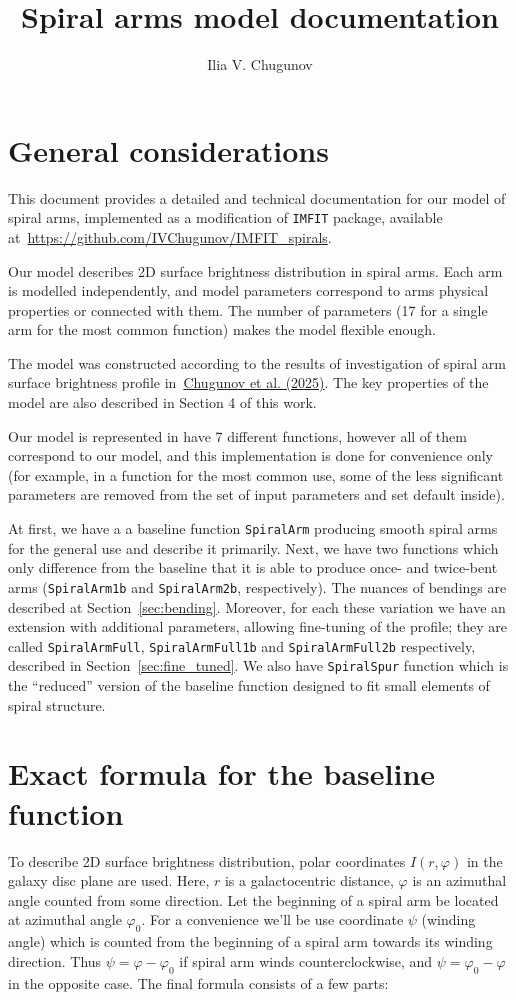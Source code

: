 \documentclass[12pt,a4paper]{article}
\title{Spiral arms model documentation}
\author{Ilia V. Chugunov}
\begin{document}
	
\maketitle
	
\section{General considerations}
This document provides a detailed and technical documentation for our model of spiral arms, implemented as a modification of \verb*|IMFIT| package, available at~\url{https://github.com/IVChugunov/IMFIT_spirals}.

Our model describes 2D surface brightness distribution in spiral arms. Each arm is modelled independently, and model parameters correspond to arms physical properties or connected with them. The number of parameters (17 for a single arm for the most common function) makes the model flexible enough.

The model was constructed according to the results of investigation of spiral arm surface brightness profile in~\href{https://ui.adsabs.harvard.edu/abs/2025Galax..13...44C/abstract}{Chugunov et al. (2025)}. The key properties of the model are also described in Section 4 of this work.

Our model is represented in have 7 different functions, however all of them correspond to our model, and this implementation is done for convenience only (for example, in a function for the most common use, some of the less significant parameters are removed from the set of input parameters and set default inside).

At first, we have a a baseline function \verb*|SpiralArm| producing smooth spiral arms for the general use and describe it primarily. Next, we have two functions which only difference from the baseline that it is able to produce once- and twice-bent arms (\verb*|SpiralArm1b| and \verb*|SpiralArm2b|, respectively). The nuances of bendings are described at Section~\ref{sec:bending}. Moreover, for each these variation we have an extension with additional parameters, allowing fine-tuning of the profile; they are called \verb*|SpiralArmFull|, \verb*|SpiralArmFull1b| and \verb*|SpiralArmFull2b| respectively, described in Section~\ref{sec:fine_tuned}. We also have \verb*|SpiralSpur| function which is the ``reduced'' version of the baseline function designed to fit small elements of spiral structure.

\section{Exact formula for the baseline function}
To describe 2D surface brightness distribution, polar coordinates $I(r, \varphi)$ in the galaxy disc plane are used. Here, $r$ is a galactocentric distance, $\varphi$ is an azimuthal angle counted from some direction. Let the beginning of a spiral arm be located at azimuthal angle $\varphi_0$. For a convenience we'll be use coordinate $\psi$ (winding angle) which is counted from the beginning of a spiral arm towards its winding direction. Thus $\psi = \varphi - \varphi_0$ if spiral arm winds counterclockwise, and $\psi = \varphi_0 - \varphi$ in the opposite case. The final formula consists of a few parts:
\end{document}
